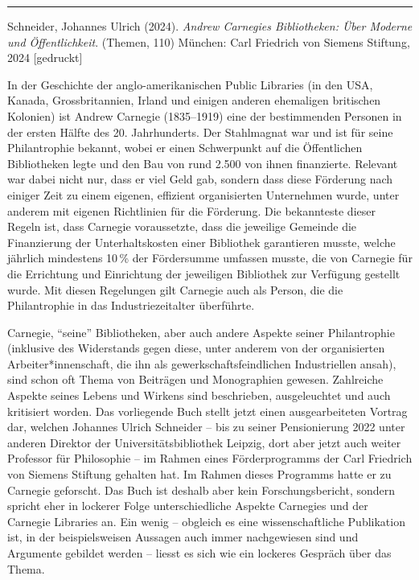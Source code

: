 \documentclass[a4paper,
fontsize=11pt,
oneside,
numbers=noperiodatend,
parskip=half-,
bibliography=totoc,
final
]{scrartcl}
\begin{document}
\begin{center}\rule{0.5\linewidth}{0.5pt}\end{center}

Schneider, Johannes Ulrich (2024). \emph{Andrew Carnegies Bibliotheken:
Über Moderne und Öffentlichkeit}. (Themen, 110) München: Carl Friedrich
von Siemens Stiftung, 2024 {[}gedruckt{]}

In der Geschichte der anglo-amerikanischen Public Libraries (in den USA,
Kanada, Grossbritannien, Irland und einigen anderen ehemaligen
britischen Kolonien) ist Andrew Carnegie (1835--1919) eine der
bestimmenden Personen in der ersten Hälfte des 20. Jahrhunderts. Der
Stahlmagnat war und ist für seine Philantrophie bekannt, wobei er einen
Schwerpunkt auf die Öffentlichen Bibliotheken legte und den Bau von rund
2.500 von ihnen finanzierte. Relevant war dabei nicht nur, dass er viel
Geld gab, sondern dass diese Förderung nach einiger Zeit zu einem
eigenen, effizient organisierten Unternehmen wurde, unter anderem mit
eigenen Richtlinien für die Förderung. Die bekannteste dieser Regeln
ist, dass Carnegie voraussetzte, dass die jeweilige Gemeinde die
Finanzierung der Unterhaltskosten einer Bibliothek garantieren musste,
welche jährlich mindestens 10\,\% der Fördersumme umfassen musste, die
von Carnegie für die Errichtung und Einrichtung der jeweiligen
Bibliothek zur Verfügung gestellt wurde. Mit diesen Regelungen gilt
Carnegie auch als Person, die die Philantrophie in das
Industriezeitalter überführte.

Carnegie, ``seine'' Bibliotheken, aber auch andere Aspekte seiner
Philantrophie (inklusive des Widerstands gegen diese, unter anderem von
der organisierten Arbeiter*innenschaft, die ihn als
gewerkschaftsfeindlichen Industriellen ansah), sind schon oft Thema von
Beiträgen und Monographien gewesen. Zahlreiche Aspekte seines Lebens und
Wirkens sind beschrieben, ausgeleuchtet und auch kritisiert worden. Das
vorliegende Buch stellt jetzt einen ausgearbeiteten Vortrag dar, welchen
Johannes Ulrich Schneider -- bis zu seiner Pensionierung 2022 unter
anderen Direktor der Universitätsbibliothek Leipzig, dort aber jetzt
auch weiter Professor für Philosophie -- im Rahmen eines Förderprogramms
der Carl Friedrich von Siemens Stiftung gehalten hat. Im Rahmen dieses
Programms hatte er zu Carnegie geforscht. Das Buch ist deshalb aber kein
Forschungsbericht, sondern spricht eher in lockerer Folge
unterschiedliche Aspekte Carnegies und der Carnegie Libraries an. Ein
wenig -- obgleich es eine wissenschaftliche Publikation ist, in der
beispielsweisen Aussagen auch immer nachgewiesen sind und Argumente
gebildet werden -- liesst es sich wie ein lockeres Gespräch über das
Thema.
\end{document}
